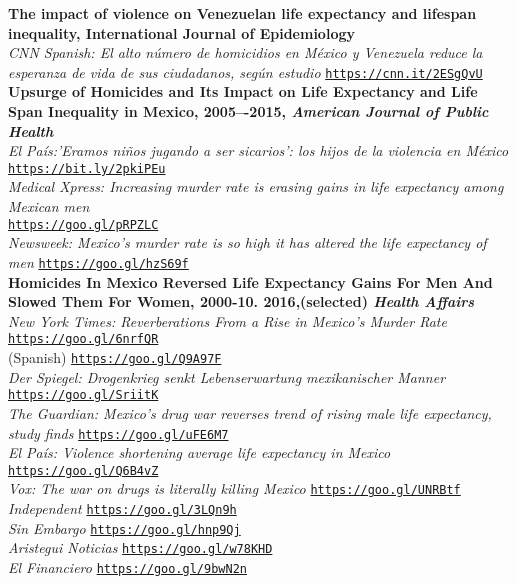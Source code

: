 \documentclass[12pt]{article}
\providecommand*\url[1]{\href{#1}{#1}}
\renewcommand*\url[1]{\href{#1}{\texttt{#1}}}
\begin{document}
\textbf{The impact of violence on Venezuelan life expectancy and lifespan inequality, International Journal of Epidemiology
}\\ 
\emph{CNN Spanish: El alto n\'umero de homicidios en M\'exico y Venezuela reduce la esperanza de vida de sus ciudadanos, seg\'un estudio} \url{https://cnn.it/2ESgQvU}\\



\textbf{Upsurge of Homicides and Its Impact on Life Expectancy and Life Span Inequality in Mexico, 2005–-2015, \emph{American Journal of Public Health}}\\
\emph{El Pa\'is:'Eramos ni\~nos jugando a ser sicarios': los hijos de la violencia en M\'exico }\\
\url{https://bit.ly/2pkiPEu}\\
\emph{ Medical Xpress: Increasing murder rate is erasing gains in life expectancy among Mexican men}\\ \url{https://goo.gl/pRPZLC}\\
\emph{ Newsweek: Mexico's murder rate is so high it has altered the life expectancy of men} \url{https://goo.gl/hzS69f}\\


\textbf{Homicides In Mexico Reversed Life Expectancy Gains For Men And Slowed Them For Women, 2000-10. 2016,(selected) \emph{Health Affairs} }\\
\emph{New York Times: Reverberations From a Rise in Mexico's Murder Rate}\\ \url{https://goo.gl/6nrfQR}\\
(Spanish) \url{https://goo.gl/Q9A97F}\\
\emph{Der Spiegel: Drogenkrieg senkt Lebenserwartung mexikanischer Manner}\\ \url{https://goo.gl/SriitK}\\
\emph{The Guardian: Mexico's drug war reverses trend of rising male life expectancy, study finds} \url{https://goo.gl/uFE6M7}\\
\emph{El Pa\'is: Violence shortening average life expectancy in Mexico}\\
 \url{https://goo.gl/Q6B4vZ}\\
\emph{Vox: The war on drugs is literally killing Mexico} \url{https://goo.gl/UNRBtf}\\
\emph{Independent} \url{https://goo.gl/3LQn9h}\\
\emph{Sin Embargo} \url{https://goo.gl/hnp9Qj}\\
\emph{Aristegui Noticias} \url{https://goo.gl/w78KHD}\\
\emph{El Financiero} \url{https://goo.gl/9bwN2n}
 
\end{document}
